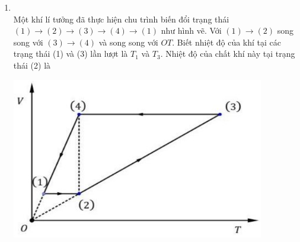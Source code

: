 \begin{enumerate}[label=\bfseries Câu \arabic*:, leftmargin=1.7cm]
\item {}\\
Một khí lí tưởng đã thực hiện chu trình biến đổi trạng thái $(1)\rightarrow (2)\rightarrow(3)\rightarrow(4)\rightarrow(1)$ như hình vẽ. Với $(1)\rightarrow(2)$ song song với $(3)\rightarrow(4)$ và song song với $OT$. Biết nhiệt độ của khí tại các trạng thái (1) và (3) lần lượt là $T_1$ và $T_3$. Nhiệt độ của chất khí này tại trạng thái (2) là
\begin{center}
	\includegraphics[width=0.45\linewidth]{../figs/VN12-Y24-PH-SYL-014P-4}
\end{center}


\end{enumerate}
